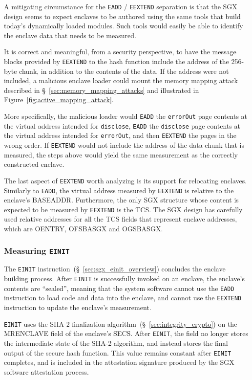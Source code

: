 A mitigating circumstance for the \texttt{EADD} / \texttt{EEXTEND} separation
is that the SGX design seems to expect enclaves to be authored using the same
tools that build today's dynamically loaded modules. Such tools would easily be
able to identify the enclave data that needs to be measured.

It is correct and meaningful, from a security perspective, to have the message
blocks provided by \texttt{EEXTEND} to the hash function include the address of
the 256-byte chunk, in addition to the contents of the data. If the address
were not included, a malicious enclave loader could mount the memory mapping
attack described in \S~\ref{sec:memory_mapping_attacks} and illustrated in
Figure~\ref{fig:active_mapping_attack}.

More specifically, the malicious loader would \texttt{EADD} the
\texttt{errorOut} page contents at the virtual address intended for
\texttt{disclose}, \texttt{EADD} the \texttt{disclose} page contents at the
virtual address intended for \texttt{errorOut}, and then \texttt{EEXTEND} the
pages in the wrong order. If \texttt{EEXTEND} would not include the address of
the data chunk that is measured, the steps above would yield the same
measurement as the correctly constructed enclave.


The last aspect of \texttt{EEXTEND} worth analyzing is its support for
relocating enclaves. Similarly to \texttt{EADD}, the virtual address measured
by \texttt{EEXTEND} is relative to the enclave's BASEADDR. Furthermore, the
only SGX structure whose content is expected to be measured by \texttt{EEXTEND}
is the TCS. The SGX design has carefully used relative addresses for all the
TCS fields that represent enclave addresses, which are OENTRY, OFSBASGX and
OGSBASGX.


\subsubsection{Measuring \texttt{EINIT}}


The \texttt{EINIT} instruction~(\S~\ref{sec:sgx_einit_overview}) concludes the
enclave building process. After \texttt{EINIT} is successfully invoked on an
enclave, the enclave's contents are ``sealed'', meaning that the system software
cannot use the \texttt{EADD} instruction to load code and data into the
enclave, and cannot use the \texttt{EEXTEND} instruction to update the
enclave's measurement.

\texttt{EINIT} uses the SHA-2 finalization
algorithm~(\S~\ref{sec:integrity_crypto}) on the MRENCLAVE field of the
enclave's SECS. After \texttt{EINIT}, the field no longer stores the
intermediate state of the SHA-2 algorithm, and instead stores the final output
of the secure hash function. This value remains constant after \texttt{EINIT}
completes, and is included in the attestation signature produced by the
SGX software attestation process.
